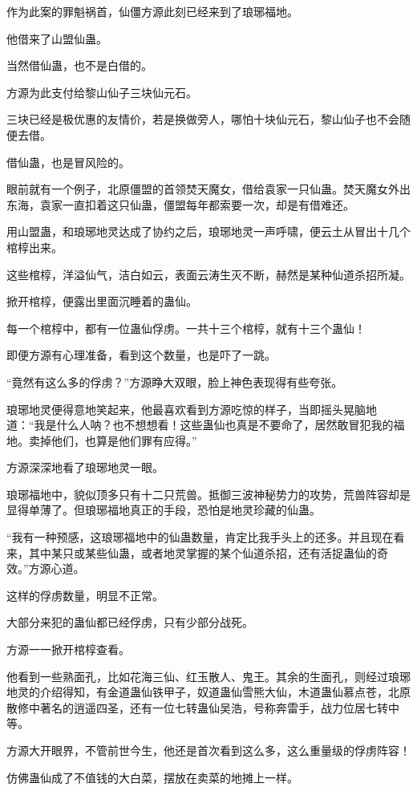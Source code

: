 \begin{this_body}
作为此案的罪魁祸首，仙僵方源此刻已经来到了琅琊福地。

他借来了山盟仙蛊。

当然借仙蛊，也不是白借的。

方源为此支付给黎山仙子三块仙元石。

三块已经是极优惠的友情价，若是换做旁人，哪怕十块仙元石，黎山仙子也不会随便去借。

借仙蛊，也是冒风险的。

眼前就有一个例子，北原僵盟的首领焚天魔女，借给袁家一只仙蛊。焚天魔女外出东海，袁家一直扣着这只仙蛊，僵盟每年都索要一次，却是有借难还。

用山盟蛊，和琅琊地灵达成了协约之后，琅琊地灵一声呼啸，便云土从冒出十几个棺椁出来。

这些棺椁，洋溢仙气，洁白如云，表面云涛生灭不断，赫然是某种仙道杀招所凝。

掀开棺椁，便露出里面沉睡着的蛊仙。

每一个棺椁中，都有一位蛊仙俘虏。一共十三个棺椁，就有十三个蛊仙！

即便方源有心理准备，看到这个数量，也是吓了一跳。

“竟然有这么多的俘虏？”方源睁大双眼，脸上神色表现得有些夸张。

琅琊地灵便得意地笑起来，他最喜欢看到方源吃惊的样子，当即摇头晃脑地道：“我是什么人呐？也不想想看！这些蛊仙也真是不要命了，居然敢冒犯我的福地。卖掉他们，也算是他们罪有应得。”

方源深深地看了琅琊地灵一眼。

琅琊福地中，貌似顶多只有十二只荒兽。抵御三波神秘势力的攻势，荒兽阵容却是显得单薄了。但琅琊福地真正的手段，恐怕是地灵珍藏的仙蛊。

“我有一种预感，这琅琊福地中的仙蛊数量，肯定比我手头上的还多。并且现在看来，其中某只或某些仙蛊，或者地灵掌握的某个仙道杀招，还有活捉蛊仙的奇效。”方源心道。

这样的俘虏数量，明显不正常。

大部分来犯的蛊仙都已经俘虏，只有少部分战死。

方源一一掀开棺椁查看。

他看到一些熟面孔，比如花海三仙、红玉散人、鬼王。其余的生面孔，则经过琅琊地灵的介绍得知，有金道蛊仙铁甲子，奴道蛊仙雪熊大仙，木道蛊仙慕点苍，北原散修中著名的逍遥四圣，还有一位七转蛊仙吴浩，号称奔雷手，战力位居七转中等。

方源大开眼界，不管前世今生，他还是首次看到这么多，这么重量级的俘虏阵容！

仿佛蛊仙成了不值钱的大白菜，摆放在卖菜的地摊上一样。


\end{this_body}
